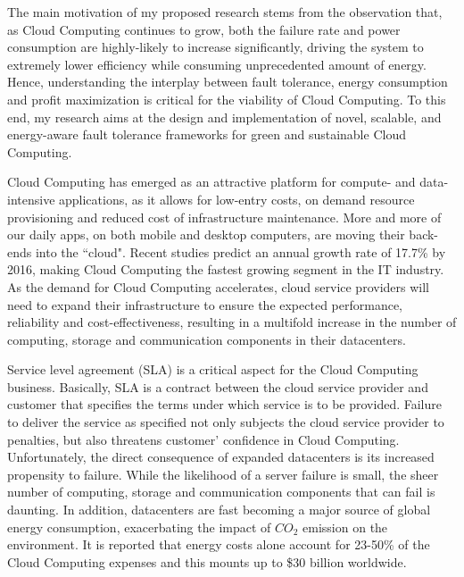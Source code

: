 The main motivation of my proposed research stems from the observation that, as Cloud Computing continues to grow, both the failure rate and power consumption are highly-likely to increase significantly, driving the system to extremely lower efficiency while consuming unprecedented amount of energy. Hence, understanding the interplay between fault tolerance, energy consumption and profit maximization is critical for the viability of Cloud Computing. To this end, my research aims at the design and implementation of novel, scalable, and energy-aware fault tolerance frameworks for green and sustainable Cloud Computing. 


Cloud Computing has emerged as an attractive platform for %
compute- and data-intensive applications, as it allows for low-entry costs, on demand resource provisioning and reduced cost of infrastructure maintenance. More and more of our daily apps, on both mobile and desktop computers, are moving their back-ends into the ``cloud". 
Recent studies predict an annual growth rate of 17.7\% by 2016, making Cloud Computing the fastest growing segment in the IT industry.
As the demand for Cloud Computing
accelerates, cloud service providers will 
need to expand their infrastructure to ensure the expected
performance, reliability and cost-effectiveness, resulting
in a multifold increase in the number of computing, storage and
communication components in their datacenters. 



Service level agreement (SLA) is a critical aspect for the Cloud Computing business. Basically, SLA is a contract between the cloud service provider and customer that specifies the terms 
under which service is to be provided. %
Failure to deliver the service as specified 
not only subjects the cloud service provider to penalties, but also threatens customer' confidence in Cloud Computing. %
Unfortunately, the direct consequence of expanded datacenters is its increased propensity to
failure. While the likelihood of a server failure is small, the
sheer number of computing, storage and communication components that
can fail is daunting. %
In addition, datacenters are fast becoming a major source of global energy consumption, exacerbating the impact of $CO_2$ emission on the environment. It is reported that energy costs alone account
for 23-50\% of the Cloud Computing expenses and this mounts up to \$30 billion worldwide. %


